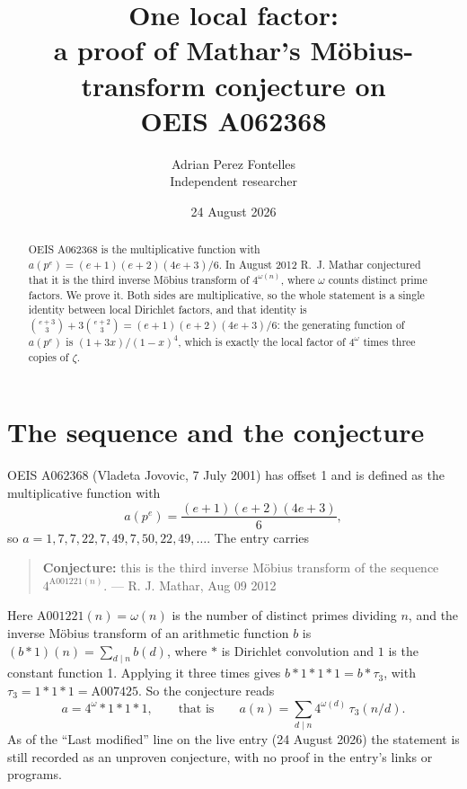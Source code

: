\documentclass[11pt,a4paper]{article}
\title{One local factor:\\
a proof of Mathar's M\"obius-transform conjecture on\\
OEIS A062368}
\author{Adrian Perez Fontelles\\ \small Independent researcher}
\date{24 August 2026}
\theoremstyle{plain}
\theoremstyle{definition}
\begin{document}
\maketitle

\begin{abstract}
OEIS A062368 is the multiplicative function with $a(p^{e})=(e+1)(e+2)(4e+3)/6$. In August
2012 R.~J. Mathar conjectured that it is the third inverse M\"obius transform of
$4^{\omega(n)}$, where $\omega$ counts distinct prime factors. We prove it. Both sides are
multiplicative, so the whole statement is a single identity between local Dirichlet
factors, and that identity is $\binom{e+3}{3}+3\binom{e+2}{3}=(e+1)(e+2)(4e+3)/6$: the
generating function of $a(p^{e})$ is $(1+3x)/(1-x)^{4}$, which is exactly the local factor
of $4^{\omega}$ times three copies of $\zeta$.
\end{abstract}

\section{The sequence and the conjecture}

OEIS A062368 (Vladeta Jovovic, 7 July 2001) has offset 1 and is defined as the
multiplicative function with
\begin{equation}\label{eq:def}
  a(p^{e})=\frac{(e+1)(e+2)(4e+3)}{6},
\end{equation}
so $a=1,7,7,22,7,49,7,50,22,49,\dots$. The entry carries

\begin{quote}
\textbf{Conjecture:} this is the third inverse M\"obius transform of the sequence
$4^{\mathrm{A001221}(n)}$. --- R. J. Mathar, Aug 09 2012
\end{quote}

Here $\mathrm{A001221}(n)=\omega(n)$ is the number of distinct primes dividing $n$, and the
inverse M\"obius transform of an arithmetic function $b$ is $(b*1)(n)=\sum_{d\mid n}b(d)$,
where $*$ is Dirichlet convolution and $1$ is the constant function 1. Applying it three
times gives $b*1*1*1=b*\tau_{3}$, with $\tau_{3}=1*1*1=\mathrm{A007425}$. So the conjecture
reads
\begin{equation}\label{eq:conj}
  a=4^{\omega}*1*1*1,\qquad\text{that is}\qquad
  a(n)=\sum_{d\mid n}4^{\omega(d)}\,\tau_{3}(n/d).
\end{equation}
As of the ``Last modified'' line on the live entry (24 August 2026) the statement is still
recorded as an unproven conjecture, with no proof in the entry's links or programs.
\end{document}
